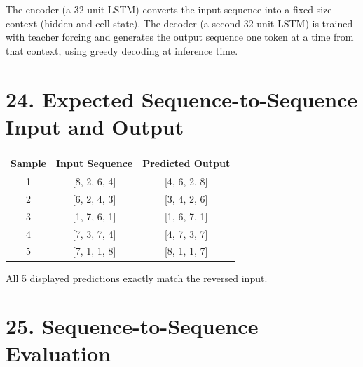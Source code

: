 \documentclass[10pt]{article}
\begin{document}
\begin{center}
\end{center}

The encoder (a 32-unit LSTM) converts the input sequence into a fixed-size
context (hidden and cell state). The decoder (a second 32-unit LSTM) is
trained with teacher forcing and generates the output sequence one token at
a time from that context, using greedy decoding at inference time.

\section*{24. Expected Sequence-to-Sequence Input and Output}

\begin{center}
\begin{tabular}{|c|c|c|}
\hline
Sample & Input Sequence & Predicted Output\\
\hline
1 & [8, 2, 6, 4] & [4, 6, 2, 8]\\
2 & [6, 2, 4, 3] & [3, 4, 2, 6]\\
3 & [1, 7, 6, 1] & [1, 6, 7, 1]\\
4 & [7, 3, 7, 4] & [4, 7, 3, 7]\\
5 & [7, 1, 1, 8] & [8, 1, 1, 7]\\
\hline
\end{tabular}
\end{center}

All 5 displayed predictions exactly match the reversed input.

\section*{25. Sequence-to-Sequence Evaluation}
\end{document}
